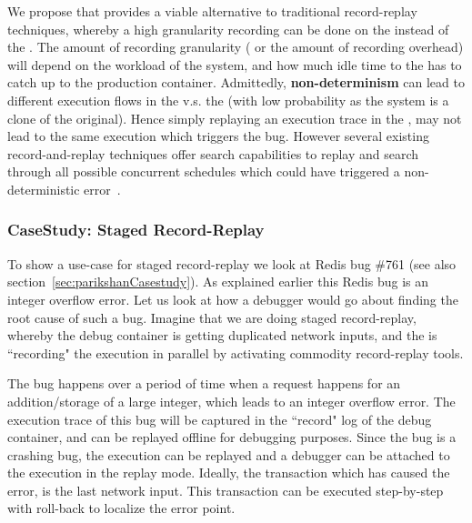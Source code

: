 We propose that \parikshan provides a viable alternative to traditional record-replay techniques, whereby a high granularity recording can be done on the \debugcontainer instead of the \productioncontainer.
The amount of recording granularity ( or the amount of recording overhead) will depend on the workload of the system, and how much idle time to the \debugcontainer has to catch up to the production container. 
Admittedly, \textbf{non-determinism} can lead to different execution flows in the \debugcontainer v.s. the \productioncontainer (with low probability as the system is a clone of the original).
Hence simply replaying an execution trace in the \debugcontainer, may not lead to the same execution which triggers the bug.
However several existing record-and-replay techniques offer search capabilities to replay and search through all possible concurrent schedules which could have triggered a non-deterministic error~\cite{dpor,best}.


\subsubsection{CaseStudy: Staged Record-Replay}

To show a use-case for staged record-replay we look at Redis bug \#761 (see also section~\ref{sec:parikshanCasestudy}). 
As explained earlier this Redis bug is an integer overflow error.
Let us look at how a debugger would go about finding the root cause of such a bug.
Imagine that we are doing staged record-replay, whereby the debug container is getting duplicated network inputs, and the \debugcontainer is ``recording" the execution in parallel by activating commodity record-replay tools.

The bug happens over a period of time when a request happens for an addition/storage of a large integer, which leads to an integer overflow error.
The execution trace of this bug will be captured in the ``record" log of the debug container, and can be replayed offline for debugging purposes.
Since the bug is a crashing bug, the execution can be replayed and a debugger can be attached to the execution in the replay mode.
Ideally, the transaction which has caused the error, is the last network input. 
This transaction can be executed step-by-step with roll-back to localize the error point.

